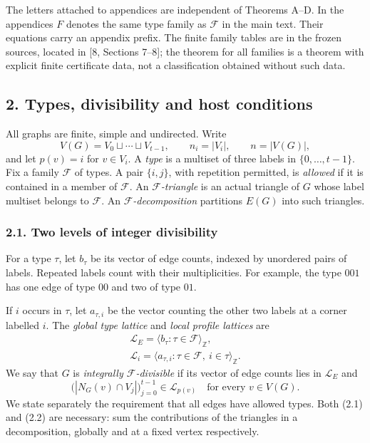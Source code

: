 \documentclass[english,11pt,a4paper]{article}
\begin{document}
The letters attached to appendices are independent of Theorems A--D. In the appendices \(F\) denotes the same type family as \(\mathcal F\) in the main text. Their equations carry an appendix prefix. The finite family tables are in the frozen sources, located in {[}8, Sections 7--8{]}; the theorem for all families is a theorem with explicit finite certificate data, not a classification obtained without such data.


\subsection{2. Types, divisibility and host conditions}\label{types-divisibility-and-host-conditions}

All graphs are finite, simple and undirected. Write \[V(G)=V_0\sqcup\cdots\sqcup V_{t-1},\qquad n_i=|V_i|,\qquad n=|V(G)|,\] and let \(p(v)=i\) for \(v\in V_i\). A \emph{type} is a multiset of three labels in \(\{0,\ldots,t-1\}\). Fix a family \(\mathcal F\) of types. A pair \(\{i,j\}\), with repetition permitted, is \emph{allowed} if it is contained in a member of \(\mathcal F\). An \emph{\(\mathcal F\)-triangle} is an actual triangle of \(G\) whose label multiset belongs to \(\mathcal F\). An \emph{\(\mathcal F\)-decomposition} partitions \(E(G)\) into such triangles.

\subsubsection{2.1. Two levels of integer divisibility}\label{two-levels-of-integer-divisibility}

For a type \(\tau\), let \(b_\tau\) be its vector of edge counts, indexed by unordered pairs of labels. Repeated labels count with their multiplicities. For example, the type \(001\) has one edge of type \(00\) and two of type \(01\).

If \(i\) occurs in \(\tau\), let \(a_{\tau,i}\) be the vector counting the other two labels at a corner labelled \(i\). The \emph{global type lattice} and \emph{local profile lattices} are \[\begin{gathered}
\mathcal L_E=\langle b_\tau:\tau\in\mathcal F\rangle_{\mathbb Z},
\\
\mathcal L_i=\langle a_{\tau,i}:\tau\in\mathcal F,\ i\in\tau\rangle_{\mathbb Z}.
\end{gathered}
\tag{2.1}\] We say that \(G\) is \emph{integrally \(\mathcal F\)-divisible} if its vector of edge counts lies in \(\mathcal L_E\) and \[\bigl(|N_G(v)\cap V_j|\bigr)_{j=0}^{t-1}\in\mathcal L_{p(v)}
\quad\text{for every }v\in V(G).
\tag{2.2}\] We state separately the requirement that all edges have allowed types. Both (2.1) and (2.2) are necessary: sum the contributions of the triangles in a decomposition, globally and at a fixed vertex respectively.
\end{document}

